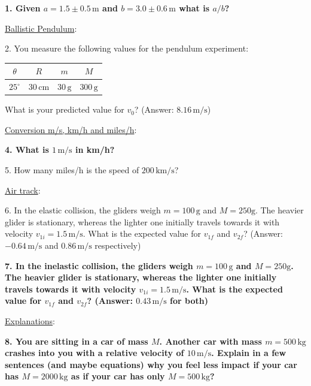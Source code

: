 {\bf{1. Given $a = 1.5 \pm 0.5\, \textrm{m}$ and $b = 3.0 \pm 0.6\, \textrm{m}$ what is $a/b$?}}\myskip

\noindent\underline{Ballistic Pendulum}:\myskip

2. You measure the following values for the pendulum experiment:
\begin{table}[h]
  \centering
  \begin{tabular}{|c|c|c|c|}
    \hline
    $\theta$&$R$&$m$&$M$\\
    \hline
    $25^\circ$ & $30\,\mathrm{cm}$ & $30\,\textrm{g}$ & $300\,\textrm{g}$\\
    \hline
  \end{tabular}
\end{table}

What is your predicted value for $v_0$? (Answer: $8.16\,\mathrm{m/s}$)\myskip

\noindent\underline{Conversion m/s, km/h and miles/h}: \myskip

{\bf{4. What is $1\, \textrm{m/s}$ in km/h?}}
\myskip

5. How many miles/h is the speed of $200\,\textrm{km/s}$?\myskip


\noindent\underline{Air track}:\myskip

6. In the elastic collision, the gliders weigh $m = 100\,\textrm{g}$ and $M = 250\textrm{g}$. The heavier glider is stationary, whereas the lighter one initially travels towards it with velocity $v_{1i} = 1.5\,\mathrm{m/s}$. What is the expected value for $v_{1f}$ and $v_{2f}$? (Answer: $-0.64\,\mathrm{m/s}$ and $0.86\,\mathrm{m/s}$ respectively)\myskip

{\bf{7. In the inelastic collision, the gliders weigh $m = 100\,\textrm{g}$ and $M = 250\textrm{g}$. The heavier glider is stationary, whereas the lighter one initially travels towards it with velocity $v_{1i} = 1.5\,\mathrm{m/s}$. What is the expected value for $v_{1f}$ and $v_{2f}$? (Answer: $0.43\,\mathrm{m/s}$ for both)}}
\myskip

\noindent\underline{Explanations}:\myskip

{\bf{8. You are sitting in a car of mass $M$. Another car with mass $m = 500\,\textrm{kg}$ crashes into you with a relative velocity of $10\,\textrm{m/s}$. Explain in a few sentences (and maybe equations) why you feel less impact if your car has $M = 2000\,\textrm{kg}$ as if your car has only $M = 500\,\textrm{kg}$? }}
\newpage
\thispagestyle{plain}
